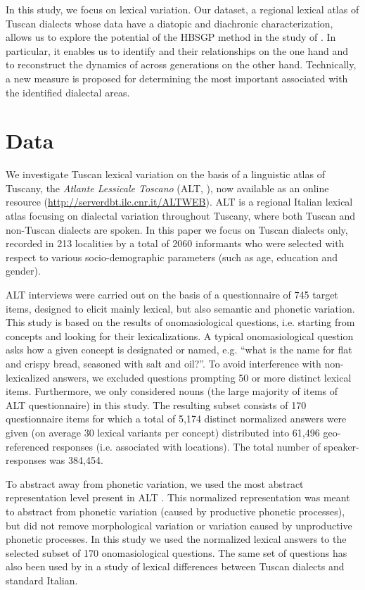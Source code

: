 \documentclass[output=paper]{LSP/langsci}
\begin{document}
In this study, we focus on lexical variation. Our dataset, a regional lexical atlas of Tuscan dialects whose data have a diatopic and diachronic characterization, allows us to explore the potential of the HBSGP method in the study of . In particular, it enables us to identify  and their relationships on the one hand and to reconstruct the dynamics of  across generations on the other hand. Technically, a new measure is proposed for determining the most important  associated with the identified dialectal areas.

\section{Data}
We investigate Tuscan lexical variation on the basis of a linguistic atlas of Tuscany, the \textit{Atlante Lessicale Toscano} (ALT, \citealt{giacomelli_atlante_2000}), now available as an online resource (\url{http://serverdbt.ilc.cnr.it/ALTWEB}). ALT is a regional Italian lexical atlas focusing on dialectal variation throughout Tuscany, where both Tuscan and non-Tuscan dialects are spoken. In this paper we focus on Tuscan dialects only, recorded in 213 localities by a total of 2060 informants who were selected with respect to various socio-demographic parameters (such as age, education and gender). 

ALT interviews were carried out on the basis of a questionnaire of 745 target items, designed to elicit mainly lexical, but also semantic and phonetic variation. This study is based on the results of onomasiological questions, i.e. starting from concepts and looking for their lexicalizations. A typical onomasiological question asks how a given concept is designated or named, e.g. “what is the name for flat and crispy bread, seasoned with salt and oil?”. To avoid interference with non-lexicalized answers, we excluded questions prompting 50 or more distinct lexical items. Furthermore, we only considered nouns (the large majority of items of ALT questionnaire) in this study. The resulting subset consists of 170 questionnaire items for which a total of 5,174 distinct normalized answers were given (on average 30 lexical variants per concept) distributed into 61,496 geo-referenced responses (i.e. associated with locations). The total number of speaker-responses was 384,454. 

To abstract away from phonetic variation, we used the most abstract representation level present in ALT \citep{cucurullo_dialectal_2006}. This normalized representation was meant to abstract from phonetic variation (caused by productive phonetic processes), but did not remove morphological variation or variation caused by unproductive phonetic processes. In this study we used the normalized lexical answers to the selected subset of 170 onomasiological questions. The same set of questions has also been used by \citet{wieling_analyzing_2014} in a study of lexical differences between Tuscan dialects and standard Italian.
\end{document}
